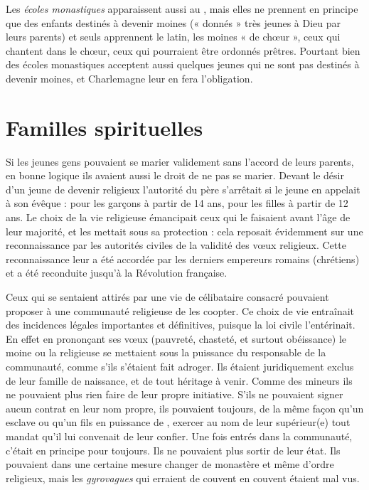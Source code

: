  Les \emph{écoles monastiques} apparaissent aussi au , mais elles ne prennent en principe que des enfants destinés à devenir moines (« donnés » très jeunes à Dieu par leurs parents) et seuls apprennent le latin, les moines « de chœur », ceux qui chantent dans le chœur, ceux qui pourraient être ordonnés prêtres. Pourtant bien des écoles monastiques acceptent aussi quelques jeunes qui ne sont pas destinés à devenir moines, et Charlemagne leur en fera l'obligation.
 
 


\section{Familles spirituelles}


 Si les jeunes gens pouvaient se marier validement sans l'accord de leurs parents, en bonne logique ils avaient aussi le droit de ne pas se marier. Devant le désir d'un jeune de devenir religieux l'autorité du père s'arrêtait si le jeune en appelait à son évêque : pour les garçons à partir de 14 ans, pour les filles à partir de 12 ans. Le choix de la vie religieuse émancipait ceux qui le faisaient avant l'âge de leur majorité, et les mettait sous sa protection : cela reposait évidemment sur une reconnaissance par les autorités civiles de la validité des vœux religieux. Cette reconnaissance leur a été accordée par les derniers empereurs romains (chrétiens) et a été reconduite jusqu'à la Révolution française.

 Ceux qui se sentaient attirés par une vie de célibataire consacré pouvaient proposer à une communauté religieuse de les coopter. Ce choix de vie entraînait des incidences légales importantes et définitives, puisque la loi civile l'entérinait. En effet en prononçant ses vœux (pauvreté, chasteté, et surtout obéissance) le moine ou la religieuse se mettaient sous la puissance du responsable de la communauté, comme s'ils s'étaient fait adroger. Ils étaient juridiquement exclus de leur famille de naissance, et de tout héritage à venir. Comme des mineurs ils ne pouvaient plus rien faire de leur propre initiative. S'ils ne pouvaient signer aucun contrat en leur nom propre, ils pouvaient toujours, de la même façon qu'un esclave ou qu'un fils en puissance de , exercer au nom de leur supérieur(e) tout mandat qu'il lui convenait de leur confier. Une fois entrés dans la communauté, c'était en principe pour toujours. Ils ne pouvaient plus sortir de leur état. Ils pouvaient dans une certaine mesure changer de monastère et même d'ordre religieux, mais les \emph{gyrovagues} qui erraient de couvent en couvent étaient mal vus. 


